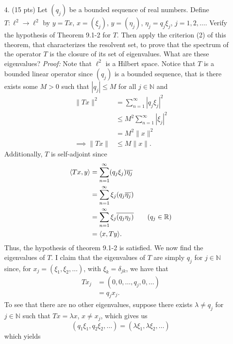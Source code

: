 \documentclass{article}
\begin{document}
\begin{itemize}
    \pagebreak
    \item[4.] (15 pts) Let $(q_j)$ be a bounded sequence of real numbers. Define $T: \ell^2 \to \ell^2$ by $y = Tx$, $x = (\xi_j)$, $y = (\eta_j)$, $\eta_j = q_j\xi_j$, $j = 1,2,\dots$. Verify the hypothesis of Theorem 9.1-2 for $T$. Then apply the criterion (2) of this theorem, that characterizes the resolvent set, to prove that the spectrum of the operator $T$ is the closure of its set of eigenvalues. What are these eigenvalues?
    \newline\newline
    \textit{Proof:} Note that $\ell^2$ is a Hilbert space. Notice that $T$ is a bounded linear operator since $(q_j)$ is a bounded sequence, that is there exists some $M > 0$ such that $|q_j| \leq M$ for all $j \in \mathbb{N}$ and 
    \begin{align*}
        \|Tx\|^2 &= \sum_{n = 1}^{\infty} |q_j\xi_j|^2\\
        &\leq M^2\sum_{n = 1}^{\infty} |\xi_j|^2\\
        &= M^2\|x\|^2\\
        \implies \|Tx\| &\leq M\|x\|.
    \end{align*}
    Additionally, $T$ is self-adjoint since
    \begin{align*}
        \langle Tx, y\rangle &= \sum_{n = 1}^{\infty} (q_j\xi_j) \overline{\eta_j}\\
        &= \sum_{n = 1}^{\infty} \xi_j (q_j \overline{\eta_j})\\
        &= \sum_{n = 1}^{\infty} \xi_j \overline{(q_j\eta_j)} \tag{$q_j \in \mathbb{R}$}\\
        &= \langle x, Ty\rangle.
    \end{align*}
    Thus, the hypothesis of theorem 9.1-2 is satisfied. We now find the eigenvalues of $T$.\newline
    I claim that the eigenvalues of $T$ are simply $q_j$ for $j \in \mathbb{N}$ since, for $x_j = (\xi_1, \xi_2, \dots)$, with $\xi_k = \delta_{jk}$, we have that 
    \begin{align*}
        Tx_j &= (0,0,\dots, q_j, 0, \dots)\\
        &= q_j x_j.
    \end{align*}
    To see that there are no other eigenvalues, suppose there exists $\lambda \neq q_j$ for $j \in \mathbb{N}$ such that $Tx = \lambda x$, $x \neq x_j$, which gives us
    \[(q_1\xi_1,q_2\xi_2,\dots) = (\lambda\xi_1, \lambda\xi_2,\dots)\]
    which yields
    \begin{align*}

\end{align*}
\end{itemize}
\end{document}
